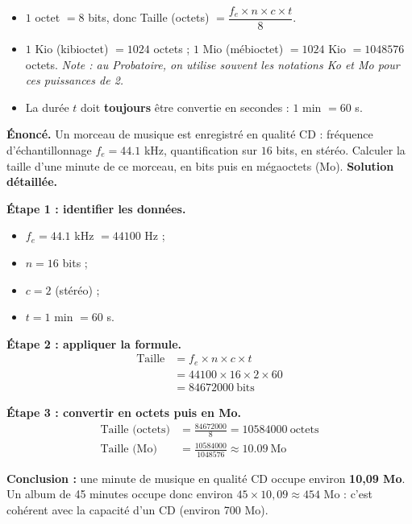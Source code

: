 \documentclass[11pt]{article}
\begin{document}
\begin{aretenir}
\begin{itemize}
\item $1$ octet $= 8$ bits, donc Taille (octets) $= \dfrac{f_e \times n \times c \times t}{8}$.
\item $1$ Kio (kibioctet) $= \num{1024}$ octets ; $1$ Mio (mébioctet) $= \num{1024}$ Kio $= \num{1048576}$ octets. \emph{Note : au Probatoire, on utilise souvent les notations Ko et Mo pour ces puissances de 2.}
\item La durée $t$ doit \textbf{toujours} être convertie en secondes : $1$ min $= 60$ s.
\end{itemize}
\end{aretenir}

\begin{exoresolu}
\textbf{Énoncé.} Un morceau de musique est enregistré en qualité CD : fréquence d'échantillonnage $f_e = \num{44,1}$ kHz, quantification sur $16$ bits, en stéréo. Calculer la taille d'une minute de ce morceau, en bits puis en mégaoctets (Mo).
\tcblower
\textbf{Solution détaillée.}

\textbf{Étape 1 : identifier les données.}
\begin{itemize}
\item $f_e = \num{44,1}$ kHz $= \num{44100}$ Hz ;
\item $n = 16$ bits ;
\item $c = 2$ (stéréo) ;
\item $t = 1$ min $= 60$ s.
\end{itemize}

\textbf{Étape 2 : appliquer la formule.}
\begin{align*}
\text{Taille} &= f_e \times n \times c \times t \\
&= \num{44100} \times 16 \times 2 \times 60 \\
&= \num{84672000}\ \text{bits}
\end{align*}

\textbf{Étape 3 : convertir en octets puis en Mo.}
\begin{align*}
\text{Taille (octets)} &= \frac{\num{84672000}}{8} = \num{10584000}\ \text{octets} \\
\text{Taille (Mo)} &= \frac{\num{10584000}}{\num{1048576}} \approx \num{10,09}\ \text{Mo}
\end{align*}

\textbf{Conclusion :} une minute de musique en qualité CD occupe environ \textbf{10,09 Mo}. Un album de 45 minutes occupe donc environ $45 \times 10,09 \approx 454$ Mo : c'est cohérent avec la capacité d'un CD (environ 700 Mo).
\end{exoresolu}
\end{document}
